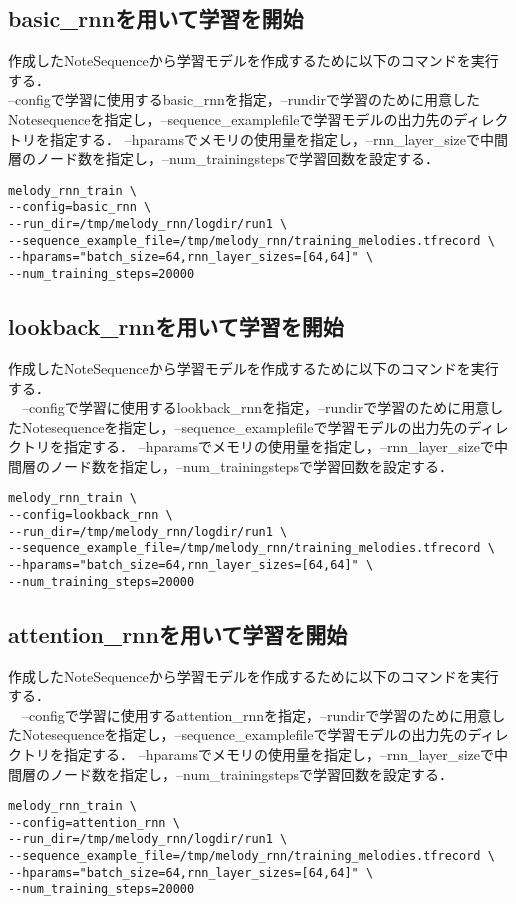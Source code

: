 \subsection{basic\_rnnを用いて学習を開始}
作成したNoteSequenceから学習モデルを作成するために以下のコマンドを実行する．\\
--configで学習に使用するbasic\_rnnを指定，--rundirで学習のために用意したNotesequenceを指定し，--sequence\_examplefileで学習モデルの出力先のディレクトリを指定する．
--hparamsでメモリの使用量を指定し，--rnn\_layer\_sizeで中間層のノード数を指定し，--num\_trainingstepsで学習回数を設定する．\\
\begin{lstlisting}[basicstyle=\ttfamily\footnotesize,frame=single]
melody_rnn_train \
--config=basic_rnn \
--run_dir=/tmp/melody_rnn/logdir/run1 \
--sequence_example_file=/tmp/melody_rnn/training_melodies.tfrecord \
--hparams="batch_size=64,rnn_layer_sizes=[64,64]" \
--num_training_steps=20000
\end{lstlisting}
\newpage
\subsection{lookback\_rnnを用いて学習を開始}
作成したNoteSequenceから学習モデルを作成するために以下のコマンドを実行する．\\
　--configで学習に使用するlookback\_rnnを指定，--rundirで学習のために用意したNotesequenceを指定し，--sequence\_examplefileで学習モデルの出力先のディレクトリを指定する．
--hparamsでメモリの使用量を指定し，--rnn\_layer\_sizeで中間層のノード数を指定し，--num\_trainingstepsで学習回数を設定する．\\
\begin{lstlisting}[basicstyle=\ttfamily\footnotesize,frame=single]
melody_rnn_train \
--config=lookback_rnn \
--run_dir=/tmp/melody_rnn/logdir/run1 \
--sequence_example_file=/tmp/melody_rnn/training_melodies.tfrecord \
--hparams="batch_size=64,rnn_layer_sizes=[64,64]" \
--num_training_steps=20000
\end{lstlisting}

\subsection{attention\_rnnを用いて学習を開始}
作成したNoteSequenceから学習モデルを作成するために以下のコマンドを実行する．\\
　--configで学習に使用するattention\_rnnを指定，--rundirで学習のために用意したNotesequenceを指定し，--sequence\_examplefileで学習モデルの出力先のディレクトリを指定する．
--hparamsでメモリの使用量を指定し，--rnn\_layer\_sizeで中間層のノード数を指定し，--num\_trainingstepsで学習回数を設定する．\\
\begin{lstlisting}[basicstyle=\ttfamily\footnotesize,frame=single]
melody_rnn_train \
--config=attention_rnn \
--run_dir=/tmp/melody_rnn/logdir/run1 \
--sequence_example_file=/tmp/melody_rnn/training_melodies.tfrecord \
--hparams="batch_size=64,rnn_layer_sizes=[64,64]" \
--num_training_steps=20000
\end{lstlisting}
\newpage
